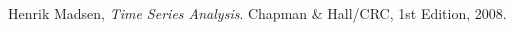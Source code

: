 \begin{thebibliography}{9}

  Henrik Madsen,
  \emph{Time Series Analysis}.
  Chapman \& Hall/CRC,
  1st Edition,
  2008.


\end{thebibliography}
